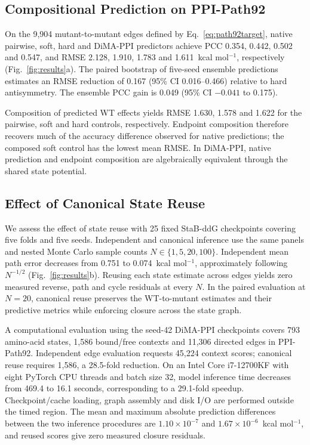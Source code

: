 \subsection{Compositional Prediction on PPI-Path92}
On the 9,904 mutant-to-mutant edges defined by
Eq.~\eqref{eq:path92target}, native pairwise, soft, hard and DiMA-PPI
predictors achieve PCC 0.354, 0.442, 0.502 and 0.547, and RMSE 2.128, 1.910,
1.783 and 1.611~kcal mol$^{-1}$, respectively (Fig.~\ref{fig:results}a).
The paired bootstrap of five-seed ensemble predictions estimates an RMSE
reduction of 0.167 (95\% CI 0.016--0.466) relative to hard antisymmetry. The ensemble
PCC gain is 0.049 (95\% CI $-0.041$ to 0.175).

Composition of predicted WT effects yields RMSE 1.630, 1.578 and 1.622
for the pairwise, soft and hard controls, respectively. Endpoint composition
therefore recovers much of the accuracy difference observed for native
predictions; the composed soft control has the lowest mean RMSE. In
DiMA-PPI, native prediction and endpoint composition are algebraically
equivalent through the shared state potential.

\subsection{Effect of Canonical State Reuse}
We assess the effect of state reuse with 25 fixed StaB-ddG checkpoints
covering five folds and five seeds. Independent and canonical inference use
the same panels and nested Monte Carlo sample counts
$N\in\{1,5,20,100\}$. Independent mean path error decreases from 0.751 to
0.074~kcal mol$^{-1}$, approximately following $N^{-1/2}$
(Fig.~\ref{fig:results}b). Reusing each state estimate across edges
yields zero measured reverse, path and cycle residuals at every $N$.
In the paired evaluation at $N=20$, canonical reuse preserves the
WT-to-mutant estimates and their predictive metrics while enforcing
closure across the state graph.

A computational evaluation using the seed-42 DiMA-PPI checkpoints covers
793 amino-acid states, 1,586 bound/free contexts and 11,306 directed edges
in PPI-Path92. Independent edge evaluation
requests 45,224 context scores; canonical reuse requires 1,586, a
28.5-fold reduction. On an Intel Core i7-12700KF with eight PyTorch CPU
threads and batch size 32, model inference time decreases from 469.4 to
16.1 seconds, corresponding to a 29.1-fold speedup. Checkpoint/cache loading, graph assembly and disk
I/O are performed outside the timed region. The mean and maximum absolute
prediction differences between the two inference procedures are $1.10\times10^{-7}$
and $1.67\times10^{-6}$~kcal mol$^{-1}$, and reused scores give zero measured
closure residuals.

